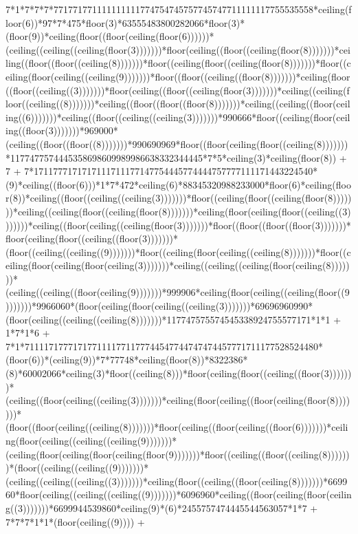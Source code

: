 7*1*7*7*7*771771771111111111774754745757745747711111117755535558*ceiling(floor(6))*97*7*475*floor(3)*63555483800282066*floor(3)*(floor(9))*ceiling(floor((floor(ceiling(floor(6))))))*(ceiling((ceiling((ceiling(floor(3)))))))*floor(ceiling((floor((ceiling(floor(8)))))))*ceiling((floor((floor((ceiling(8)))))))*floor((ceiling(floor((ceiling(floor(8)))))))*floor((ceiling(floor(ceiling((ceiling(9)))))))*floor((floor((ceiling((floor(8)))))))*ceiling(floor((floor((ceiling((3)))))))*floor(ceiling((floor((ceiling(floor(3)))))))*ceiling((ceiling(floor((ceiling((8)))))))*ceiling((floor((floor((floor(8)))))))*ceiling((ceiling((floor(ceiling((6)))))))*ceiling((floor((ceiling((ceiling(3)))))))*990666*floor((ceiling(floor(ceiling((floor(3)))))))*969000*(ceiling((floor((floor((8)))))))*990690969*floor((floor(ceiling(floor((ceiling(8)))))))*1177477574445358698609989986638332344445*7*5*ceiling(3)*ceiling(floor(8)) + 7 + 7*1711777171717111711177147754445774444757777111171443224540*(9)*ceiling((floor(6)))*1*7*472*ceiling(6)*88345320988233000*floor(6)*ceiling(floor(8))*ceiling((floor((ceiling((ceiling(3)))))))*floor((ceiling(floor((ceiling(floor(8)))))))*ceiling((ceiling(floor((ceiling(floor(8)))))))*ceiling(floor(ceiling(floor((ceiling((3)))))))*ceiling((floor(ceiling((ceiling(floor(3)))))))*floor((floor((floor((floor(3)))))))*floor(ceiling(floor((ceiling((floor(3)))))))*(floor((ceiling((ceiling((9)))))))*floor((ceiling(floor(ceiling((ceiling(8)))))))*floor((ceiling(floor(ceiling(floor(ceiling(3)))))))*ceiling((ceiling((ceiling(floor(ceiling(8)))))))*(ceiling((ceiling((floor(ceiling(9)))))))*999906*ceiling(floor(ceiling((ceiling(floor((9)))))))*9966060*(floor(ceiling(floor(ceiling((ceiling(3)))))))*69696960990*(floor(ceiling((ceiling((ceiling(8)))))))*117747575574545338924755577171*1*1 + 1*7*1*6 + 7*1*7111171777171771111771177744547744747474457771711177528524480*(floor(6))*(ceiling(9))*7*77748*ceiling(floor(8))*8322386*(8)*60002066*ceiling(3)*floor((ceiling(8)))*floor(ceiling(floor((ceiling((floor(3)))))))*(ceiling((floor(ceiling((ceiling(3)))))))*ceiling(floor(ceiling((floor(ceiling(floor(8)))))))*(floor((floor(ceiling((ceiling(8)))))))*floor(ceiling((floor(ceiling((floor(6)))))))*ceiling(floor(ceiling((ceiling((ceiling(9)))))))*(ceiling(floor(ceiling(floor(ceiling(floor(9)))))))*floor((ceiling((floor((ceiling(8)))))))*(floor((ceiling((ceiling((9)))))))*(ceiling((ceiling((ceiling((3)))))))*ceiling(floor((ceiling((floor(ceiling(8)))))))*669960*floor(ceiling((ceiling((ceiling((9)))))))*6096960*ceiling((floor(ceiling(floor(ceiling((3)))))))*6699944539860*ceiling(9)*(6)*2455757474445544563057*1*7 + 7*7*7*1*1*(floor(ceiling((9)))) + 